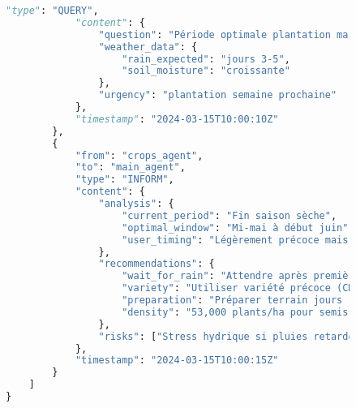\begin{figure}[h]
\begin{lstlisting}[language=Python, caption=Exemples de communications inter-agents en action]
            "type": "QUERY",
            "content": {
                "question": "Période optimale plantation maïs Garoua?",
                "weather_data": {
                    "rain_expected": "jours 3-5",
                    "soil_moisture": "croissante"
                },
                "urgency": "plantation semaine prochaine"
            },
            "timestamp": "2024-03-15T10:00:10Z"
        },
        {
            "from": "crops_agent",
            "to": "main_agent",
            "type": "INFORM",
            "content": {
                "analysis": {
                    "current_period": "Fin saison sèche",
                    "optimal_window": "Mi-mai à début juin",
                    "user_timing": "Légèrement précoce mais acceptable"
                },
                "recommendations": {
                    "wait_for_rain": "Attendre après premières pluies (jour 3-4)",
                    "variety": "Utiliser variété précoce (CMS 8704)",
                    "preparation": "Préparer terrain jours 1-2",
                    "density": "53,000 plants/ha pour semis précoce"
                },
                "risks": ["Stress hydrique si pluies retardées"]
            },
            "timestamp": "2024-03-15T10:00:15Z"
        }
    ]
}


\end{lstlisting}
\end{figure}
